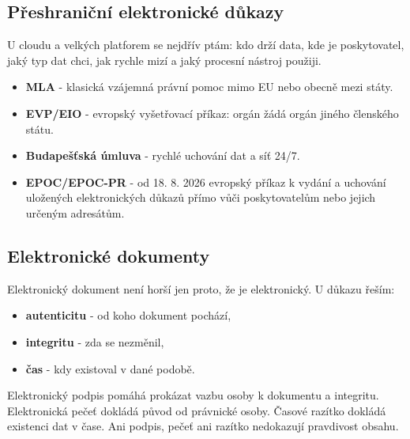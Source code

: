
\subsection*{Přeshraniční elektronické důkazy}
U cloudu a velkých platforem se nejdřív ptám: kdo drží data, kde je poskytovatel, jaký typ dat chci, jak rychle mizí a jaký procesní nástroj použiji.

\begin{itemize}
  \item \textbf{MLA} - klasická vzájemná právní pomoc mimo EU nebo obecně mezi státy.
  \item \textbf{EVP/EIO} - evropský vyšetřovací příkaz: orgán žádá orgán jiného členského státu.
  \item \textbf{Budapešťská úmluva} - rychlé uchování dat a síť 24/7.
  \item \textbf{EPOC/EPOC-PR} - od 18. 8. 2026 evropský příkaz k vydání a uchování uložených elektronických důkazů přímo vůči poskytovatelům nebo jejich určeným adresátům.
\end{itemize}


\subsection*{Elektronické dokumenty}
Elektronický dokument není horší jen proto, že je elektronický. U důkazu řeším:
\begin{itemize}
  \item \textbf{autenticitu} - od koho dokument pochází,
  \item \textbf{integritu} - zda se nezměnil,
  \item \textbf{čas} - kdy existoval v dané podobě.
\end{itemize}

Elektronický podpis pomáhá prokázat vazbu osoby k dokumentu a integritu. Elektronická pečeť dokládá původ od právnické osoby. Časové razítko dokládá existenci dat v čase. Ani podpis, pečeť ani razítko nedokazují pravdivost obsahu.

